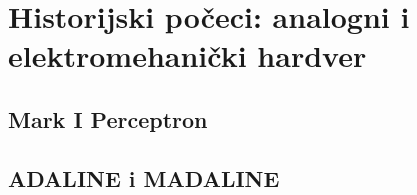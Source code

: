 \section{Historijski počeci: analogni i elektromehanički hardver}

\subsection{Mark I Perceptron}

\subsection{ADALINE i MADALINE}
